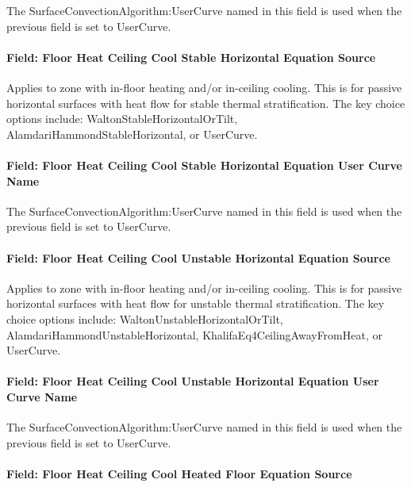The SurfaceConvectionAlgorithm:UserCurve named in this field is used when the previous field is set to UserCurve.

\paragraph{Field: Floor Heat Ceiling Cool Stable Horizontal Equation Source}\label{field-floor-heat-ceiling-cool-stable-horizontal-equation-source}

Applies to zone with in-floor heating and/or in-ceiling cooling. This is for passive horizontal surfaces with heat flow for stable thermal stratification. The key choice options include: WaltonStableHorizontalOrTilt, AlamdariHammondStableHorizontal, or UserCurve.

\paragraph{Field: Floor Heat Ceiling Cool Stable Horizontal Equation User Curve Name}\label{field-floor-heat-ceiling-cool-stable-horizontal-equation-user-curve-name}

The SurfaceConvectionAlgorithm:UserCurve named in this field is used when the previous field is set to UserCurve.

\paragraph{Field: Floor Heat Ceiling Cool Unstable Horizontal Equation Source}\label{field-floor-heat-ceiling-cool-unstable-horizontal-equation-source}

Applies to zone with in-floor heating and/or in-ceiling cooling. This is for passive horizontal surfaces with heat flow for unstable thermal stratification. The key choice options include: WaltonUnstableHorizontalOrTilt, AlamdariHammondUnstableHorizontal, KhalifaEq4CeilingAwayFromHeat, or UserCurve.

\paragraph{Field: Floor Heat Ceiling Cool Unstable Horizontal Equation User Curve Name}\label{field-floor-heat-ceiling-cool-unstable-horizontal-equation-user-curve-name}

The SurfaceConvectionAlgorithm:UserCurve named in this field is used when the previous field is set to UserCurve.

\paragraph{Field: Floor Heat Ceiling Cool Heated Floor Equation Source}\label{field-floor-heat-ceiling-cool-heated-floor-equation-source}

